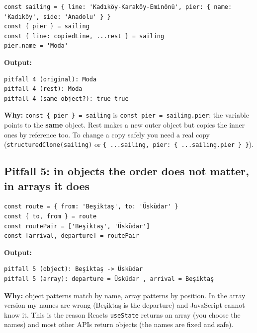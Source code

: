 \documentclass[
  10pt,
]{article}
\begin{document}
\begin{verbatim}
const sailing = { line: 'Kadıköy-Karaköy-Eminönü', pier: { name: 'Kadıköy', side: 'Anadolu' } }
const { pier } = sailing
const { line: copiedLine, ...rest } = sailing
pier.name = 'Moda'
\end{verbatim}

\textbf{Output:}

\begin{verbatim}
pitfall 4 (original): Moda
pitfall 4 (rest): Moda
pitfall 4 (same object?): true true
\end{verbatim}

\textbf{Why:} \texttt{const \{ pier \} =\allowbreak{} sailing} is
\texttt{const pier =\allowbreak{} sailing.\allowbreak{}pier}: the
variable points to the \textbf{same} object. Rest makes a new outer
object but copies the inner ones by reference too. To change a copy
safely you need a real copy
(\texttt{structuredClone(\allowbreak{}sailing)} or
\texttt{\{ .\allowbreak{}.\allowbreak{}.\allowbreak{}sailing,\allowbreak{} pier:\allowbreak{} \{ .\allowbreak{}.\allowbreak{}.\allowbreak{}sailing.\allowbreak{}pier \} \}}).

\hypertarget{pitfall-5-in-objects-the-order-does-not-matter-in-arrays-it-does}{%
\subsection{Pitfall 5: in objects the order does not matter, in arrays
it
does}\label{pitfall-5-in-objects-the-order-does-not-matter-in-arrays-it-does}}

\begin{verbatim}
const route = { from: 'Beşiktaş', to: 'Üsküdar' }
const { to, from } = route
const routePair = ['Beşiktaş', 'Üsküdar']
const [arrival, departure] = routePair
\end{verbatim}

\textbf{Output:}

\begin{verbatim}
pitfall 5 (object): Beşiktaş -> Üsküdar
pitfall 5 (array): departure = Üsküdar , arrival = Beşiktaş
\end{verbatim}

\textbf{Why:} object patterns match by name, array patterns by position.
In the array version my names are wrong (Beşiktaş is the departure) and
JavaScript cannot know it. This is the reason React\textquotesingle s
\texttt{useState} returns an array (you choose the names) and most other
APIs return objects (the names are fixed and safe).
\end{document}
